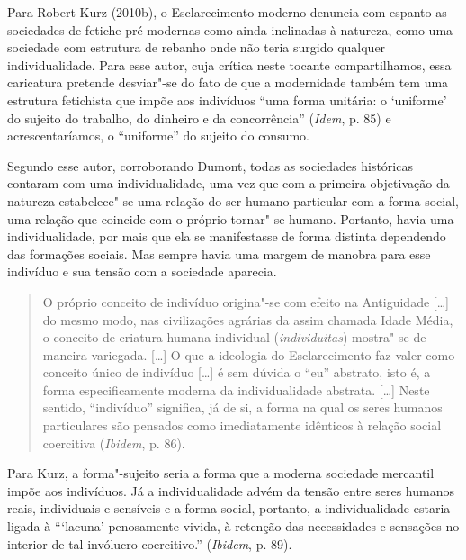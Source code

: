 Para Robert Kurz (2010b), o Esclarecimento moderno denuncia com espanto
as sociedades de fetiche pré-modernas como ainda inclinadas à natureza,
como uma sociedade com estrutura de rebanho onde não teria surgido
qualquer individualidade. Para esse autor, cuja crítica neste tocante
compartilhamos, essa caricatura pretende desviar"-se do fato de que a
modernidade também tem uma estrutura fetichista que impõe aos indivíduos
``uma forma unitária: o `uniforme' do sujeito do trabalho, do dinheiro e
da concorrência'' (\emph{Idem}, p. 85) e acrescentaríamos, o
``uniforme'' do sujeito do consumo.

Segundo esse autor, corroborando Dumont, todas as sociedades históricas
contaram com uma individualidade, uma vez que com a primeira objetivação
da natureza estabelece"-se uma relação do ser humano particular com a
forma social, uma relação que coincide com o próprio tornar"-se humano.
Portanto, havia uma individualidade, por mais que ela se manifestasse de
forma distinta dependendo das formações sociais. Mas sempre havia uma
margem de manobra para esse indivíduo e sua tensão com a sociedade
aparecia.

\begin{quote}
O próprio conceito de indivíduo origina"-se com efeito na Antiguidade
[\ldots{}] do mesmo modo, nas civilizações agrárias da assim chamada
Idade Média, o conceito de criatura humana individual
(\emph{individuitas}) mostra"-se de maneira variegada. [\ldots{}] O que a
ideologia do Esclarecimento faz valer como conceito único de indivíduo
[\ldots{}] é sem dúvida o ``eu'' abstrato, isto é, a forma
especificamente moderna da individualidade abstrata. [\ldots{}] Neste
sentido, ``indivíduo'' significa, já de si, a forma na qual os seres
humanos particulares são pensados como imediatamente idênticos à relação
social coercitiva (\emph{Ibidem}, p. 86).
\end{quote}

Para Kurz, a forma"-sujeito seria a forma que a moderna sociedade
mercantil impõe aos indivíduos. Já a individualidade advém da tensão
entre seres humanos reais, individuais e sensíveis e a forma social,
portanto, a individualidade estaria ligada à ```lacuna' penosamente
vivida, à retenção das necessidades e sensações no interior de tal
invólucro coercitivo.'' (\emph{Ibidem}, p. 89).

